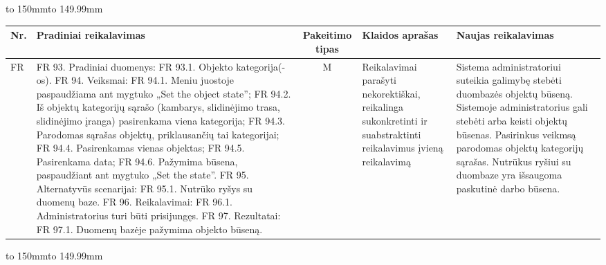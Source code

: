\documentclass[oneside]{VUMIFPSkursinis}
\begin{document}
	

\hbox to 150mm{\hbox to 149.99mm{}}


\begin{table}[htbp]


\begin{tabularx}{1\textwidth}{  |P{1cm}|X|c|p{3.5cm}|X| }  \hline

Nr. & Pradiniai reikalavimas&  Pakeitimo tipas & Klaidos aprašas  & Naujas reikalavimas \\ \hline
FR & 
FR 93. Pradiniai duomenys: 
FR 93.1. Objekto kategorija(-os). 
FR 94. Veiksmai: 
FR 94.1. Meniu juostoje paspaudžiama ant mygtuko „Set the object state”;
 FR 94.2. Iš objektų kategorijų sąrašo (kambarys, slidinėjimo trasa, slidinėjimo įranga) pasirenkama viena kategorija;
 FR 94.3. Parodomas sąrašas objektų, priklausančių tai kategorijai;
 FR 94.4. Pasirenkamas vienas objektas; FR 94.5. Pasirenkama data;
 FR 94.6. Pažymima būsena, paspaudžiant ant mygtuko „Set the state”.
 FR 95. Alternatyvūs scenarijai:
 FR 95.1. Nutrūko ryšys su duomenų baze.
 FR 96. Reikalavimai: 
FR 96.1. Administratorius turi būti prisijungęs.
 FR 97. Rezultatai:
 FR 97.1. Duomenų bazėje pažymima objekto būseną. 
& M & Reikalavimai parašyti nekorektiškai, reikalinga sukonkretinti ir suabstraktinti reikalavimus įvieną reikalavimą &
Sistema administratoriui suteikia galimybę stebėti duombazės objektų būseną. Sistemoje administratorius gali stebėti arba keisti objektų būsenas. Pasirinkus veikmsą parodomas objektų kategorijų sąrašas. Nutrūkus ryšiui su duombaze yra išsaugoma paskutinė darbo būsena.\\ \hline

\end{tabularx}

	
\end{table}

\hbox to 150mm{\hbox to 149.99mm{}}
\end{document}
